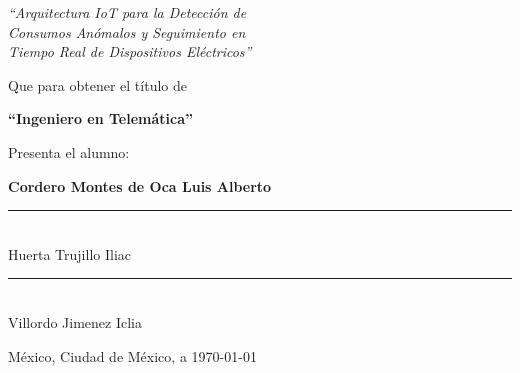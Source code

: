 \documentclass{report}
\theoremstyle{mytheoremstyle}
\theoremstyle{mytheoremstyle}
\theoremstyle{myproblemstyle}
\begin{document}
\begin{titlepage}
\begin{flushright}
\begin{minipage}{0.85\textwidth}
\begin{center}
            {\large\itshape ``Arquitectura IoT para la Detección de\\
            Consumos Anómalos y Seguimiento en\\
            Tiempo Real de Dispositivos Eléctricos''}\par
            \vspace{1.5cm}
            
            {\large Que para obtener el título de}\par
            \vspace{0.5cm}
            {\large\bfseries``Ingeniero en Telemática''}\par
            \vspace{1.5cm}
            
            {\large Presenta el alumno:}\par
            \vspace{0.5cm}
            {\large\bfseries Cordero Montes de Oca Luis Alberto}\par
            \vspace{1.5cm}
            
            \begin{minipage}{0.45\textwidth}
                \centering
                \rule{6cm}{0.4pt}\\
                {\large Huerta Trujillo Iliac}
            \end{minipage}
            \hfill
            \begin{minipage}{0.45\textwidth}
                \centering
                \rule{6cm}{0.4pt}\\
                {\large Villordo Jimenez Iclia}
            \end{minipage}
            
            \vfill
            \vspace{2cm}   %
            {\large México, Ciudad de México, a \today}\par
        \end{center}
    \end{minipage}
    \end{flushright}

\end{titlepage}

\restoregeometry
\end{document}
